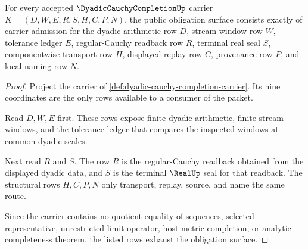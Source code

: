 \begin{theorem}
\label{thm:dyadic-cauchy-completion-obligation-surface}
For every accepted $\DyadicCauchyCompletionUp$ carrier $K=(D,W,E,R,S,H,C,P,N)$, the public obligation surface consists exactly of carrier admission for the dyadic arithmetic row $D$, stream-window row $W$, tolerance ledger $E$, regular-Cauchy readback row $R$, terminal real seal $S$, componentwise transport row $H$, displayed replay row $C$, provenance row $P$, and local naming row $N$.
\end{theorem}
\begin{proof}
Project the carrier of \autoref{def:dyadic-cauchy-completion-carrier}. Its nine coordinates are the only rows available to a consumer of the packet.

Read $D,W,E$ first. These rows expose finite dyadic arithmetic, finite stream windows, and the tolerance ledger that compares the inspected windows at common dyadic scales.

Next read $R$ and $S$. The row $R$ is the regular-Cauchy readback obtained from the displayed dyadic data, and $S$ is the terminal $\RealUp$ seal for that readback. The structural rows $H,C,P,N$ only transport, replay, source, and name the same route.

Since the carrier contains no quotient equality of sequences, selected representative, unrestricted limit operator, host metric completion, or analytic completeness theorem, the listed rows exhaust the obligation surface.
\end{proof}

